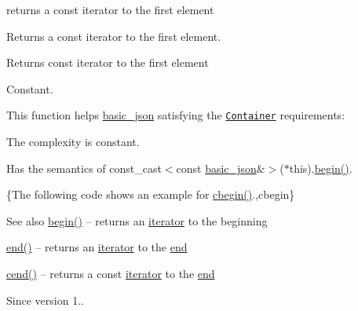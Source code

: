 returns a const iterator to the first element 

Returns a const iterator to the first element.

 \begin{DoxyReturn}{Returns}
const iterator to the first element
\end{DoxyReturn}
Constant.

This function helps {\ttfamily \hyperlink{classnlohmann_1_1basic__json}{basic\+\_\+json}} satisfying the \href{https://en.cppreference.com/w/cpp/named_req/Container}{\tt Container} requirements\+:
\begin{DoxyItemize}
\item The complexity is constant.
\item Has the semantics of {\ttfamily const\+\_\+cast$<$const \hyperlink{classnlohmann_1_1basic__json}{basic\+\_\+json}\&$>$($\ast$this).\hyperlink{classnlohmann_1_1basic__json_a0ff28dac23f2bdecee9564d07f51dcdc}{begin()}}.
\end{DoxyItemize}

\{The following code shows an example for {\ttfamily \hyperlink{classnlohmann_1_1basic__json_ad865d6c291b237ae508d5cb2146b5877}{cbegin()}}.,cbegin\}

\begin{DoxySeeAlso}{See also}
\hyperlink{classnlohmann_1_1basic__json_a0ff28dac23f2bdecee9564d07f51dcdc}{begin()} -- returns an \hyperlink{classnlohmann_1_1basic__json_a099316232c76c034030a38faa6e34dca}{iterator} to the beginning 

\hyperlink{classnlohmann_1_1basic__json_a13e032a02a7fd8a93fdddc2fcbc4763c}{end()} -- returns an \hyperlink{classnlohmann_1_1basic__json_a099316232c76c034030a38faa6e34dca}{iterator} to the \hyperlink{classnlohmann_1_1basic__json_a13e032a02a7fd8a93fdddc2fcbc4763c}{end} 

\hyperlink{classnlohmann_1_1basic__json_a8dba7b7d2f38e6b0c614030aa43983f6}{cend()} -- returns a const \hyperlink{classnlohmann_1_1basic__json_a099316232c76c034030a38faa6e34dca}{iterator} to the \hyperlink{classnlohmann_1_1basic__json_a13e032a02a7fd8a93fdddc2fcbc4763c}{end}
\end{DoxySeeAlso}
\begin{DoxySince}{Since}
version 1.. 
\end{DoxySince}
